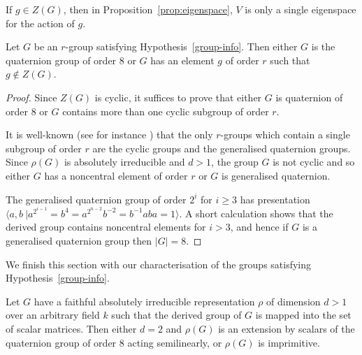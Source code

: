 If $g \in Z(G)$, then in Proposition~\ref{prop:eigenspace}, $V$ is only a single eigenspace for the action of $g$. 


\begin{Theo}  \label{thm:exists_g}
Let $G$ be an  $r$-group %
satisfying Hypothesis~\ref{group-info}. Then either 
$G$ is the quaternion group of order $8$ or $G$ 
has an element $g$ of order $r$ such that 
$g \not \in Z(G)$. %
\end{Theo}

\begin{proof}
Since $Z(G)$ is cyclic, it suffices to prove 
that either $G$ is quaternion of order $8$ or 
$G$ contains more than one cyclic subgroup of order $r$. 

It is well-known (see for instance \cite[3.15]{Zassenhaus}) 
that the only $r$-groups which contain a single 
subgroup of order $r$ are the cyclic groups and 
the generalised quaternion groups. Since $\rho(G)$ 
is absolutely irreducible and $d > 1$, the group 
$G$ is not cyclic and so either $G$ has a noncentral 
element of order $r$ or $G$ is generalised quaternion.

The generalised quaternion group of order $2^i$ 
for $i \geq 3$ has presentation 
$\langle a, b \ | a^{2^{i-1}} = b^4 = 
a^{2^{n-2}}b^{-2} =  b^{-1} a ba = 1 \rangle$. 
A short calculation shows that the derived group 
contains noncentral elements for $i > 3$, 
and hence if $G$ is a generalised quaternion 
group then $|G| = 8$.
\end{proof}

We finish this section with our characterisation 
of the groups satisfying Hypothesis~\ref{group-info}.

\begin{Theo}  \label{thm:classify_scalars}
Let $G$ have a faithful absolutely irreducible 
representation $\rho$ of dimension $d > 1$ over an arbitrary field $k$ 
such that the derived group of $G$ is mapped
into the set of scalar matrices. 
Then either $d = 2$ and $\rho(G)$ 
is an extension by scalars of the quaternion 
group of order $8$ acting semilinearly, 
or $\rho(G)$ is imprimitive.
\end{Theo}

